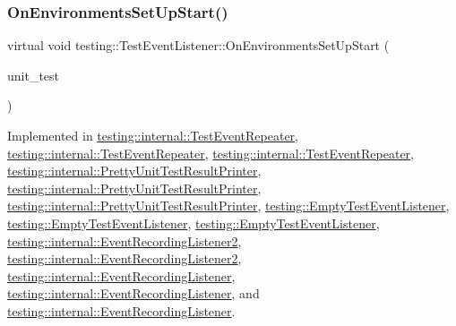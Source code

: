 \subsubsection{\texorpdfstring{OnEnvironmentsSetUpStart()}{OnEnvironmentsSetUpStart()}\hspace{0.1cm}{\footnotesize\ttfamily [1/3]}}
{\footnotesize\ttfamily virtual void testing\+::\+Test\+Event\+Listener\+::\+On\+Environments\+Set\+Up\+Start (\begin{DoxyParamCaption}\item[{const \mbox{\hyperlink{classtesting_1_1_unit_test}{Unit\+Test}} \&}]{unit\+\_\+test }\end{DoxyParamCaption})\hspace{0.3cm}{\ttfamily [pure virtual]}}



Implemented in \mbox{\hyperlink{classtesting_1_1internal_1_1_test_event_repeater_a739b5fd1f5bcb96b42089ff06281b3ea}{testing\+::internal\+::\+Test\+Event\+Repeater}}, \mbox{\hyperlink{classtesting_1_1internal_1_1_test_event_repeater_a739b5fd1f5bcb96b42089ff06281b3ea}{testing\+::internal\+::\+Test\+Event\+Repeater}}, \mbox{\hyperlink{classtesting_1_1internal_1_1_test_event_repeater_ae71819925adec0471fa7abc5072b8244}{testing\+::internal\+::\+Test\+Event\+Repeater}}, \mbox{\hyperlink{classtesting_1_1internal_1_1_pretty_unit_test_result_printer_ac17a4a708aca7df5876e48868408a2be}{testing\+::internal\+::\+Pretty\+Unit\+Test\+Result\+Printer}}, \mbox{\hyperlink{classtesting_1_1internal_1_1_pretty_unit_test_result_printer_ac17a4a708aca7df5876e48868408a2be}{testing\+::internal\+::\+Pretty\+Unit\+Test\+Result\+Printer}}, \mbox{\hyperlink{classtesting_1_1internal_1_1_pretty_unit_test_result_printer_af794208caa6ea4fcd91a4d4da0ec93c0}{testing\+::internal\+::\+Pretty\+Unit\+Test\+Result\+Printer}}, \mbox{\hyperlink{classtesting_1_1_empty_test_event_listener_a6e498ae763ac8c1a46bd861e0b7ff3f5}{testing\+::\+Empty\+Test\+Event\+Listener}}, \mbox{\hyperlink{classtesting_1_1_empty_test_event_listener_a6e498ae763ac8c1a46bd861e0b7ff3f5}{testing\+::\+Empty\+Test\+Event\+Listener}}, \mbox{\hyperlink{classtesting_1_1_empty_test_event_listener_a156d1965248fbdced6aabacadfa2d63f}{testing\+::\+Empty\+Test\+Event\+Listener}}, \mbox{\hyperlink{classtesting_1_1internal_1_1_event_recording_listener2_a555f80451b123922a7f21930e45a256f}{testing\+::internal\+::\+Event\+Recording\+Listener2}}, \mbox{\hyperlink{classtesting_1_1internal_1_1_event_recording_listener2_a555f80451b123922a7f21930e45a256f}{testing\+::internal\+::\+Event\+Recording\+Listener2}}, \mbox{\hyperlink{classtesting_1_1internal_1_1_event_recording_listener_ae192e9289f576fc770b549a575d8e786}{testing\+::internal\+::\+Event\+Recording\+Listener}}, \mbox{\hyperlink{classtesting_1_1internal_1_1_event_recording_listener_ae192e9289f576fc770b549a575d8e786}{testing\+::internal\+::\+Event\+Recording\+Listener}}, and \mbox{\hyperlink{classtesting_1_1internal_1_1_event_recording_listener_add61e6e7ebffb8afc90ccabcdc9f9982}{testing\+::internal\+::\+Event\+Recording\+Listener}}.

